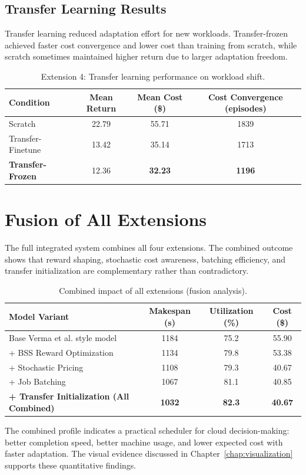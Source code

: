 \subsection{Transfer Learning Results}
Transfer learning reduced adaptation effort for new workloads. Transfer-frozen achieved faster cost convergence and lower cost than training from scratch, while scratch sometimes maintained higher return due to larger adaptation freedom.

\renewcommand{\arraystretch}{1.15}
\begin{table}[H]
\centering
\caption{Extension 4: Transfer learning performance on workload shift.}
\label{tab:ext4_results}
\begin{tabular}{|l|c|c|c|}
\hline
\textbf{Condition} & \textbf{Mean Return} & \textbf{Mean Cost (\$)} & \textbf{Cost Convergence (episodes)} \\
\hline
Scratch & 22.79 & 55.71 & 1839 \\
\hline
Transfer-Finetune & 13.42 & 35.14 & 1713 \\
\hline
\textbf{Transfer-Frozen} & 12.36 & \textbf{32.23} & \textbf{1196} \\
\hline
\end{tabular}
\end{table}

\section{Fusion of All Extensions}
The full integrated system combines all four extensions. The combined outcome shows that reward shaping, stochastic cost awareness, batching efficiency, and transfer initialization are complementary rather than contradictory.

\renewcommand{\arraystretch}{1.15}
\begin{table}[H]
\centering
\caption{Combined impact of all extensions (fusion analysis).}
\label{tab:fusion_results}
\begin{tabular}{|l|c|c|c|}
\hline
\textbf{Model Variant} & \textbf{Makespan (s)} & \textbf{Utilization (\%)} & \textbf{Cost (\$)} \\
\hline
Base Verma et al. style model & 1184 & 75.2 & 55.90 \\
\hline
+ BSS Reward Optimization & 1134 & 79.8 & 53.38 \\
\hline
+ Stochastic Pricing & 1108 & 79.3 & 40.67 \\
\hline
+ Job Batching & 1067 & 81.1 & 40.85 \\
\hline
\textbf{+ Transfer Initialization (All Combined)} & \textbf{1032} & \textbf{82.3} & \textbf{40.67} \\
\hline
\end{tabular}
\end{table}

The combined profile indicates a practical scheduler for cloud decision-making: better completion speed, better machine usage, and lower expected cost with faster adaptation. The visual evidence discussed in Chapter~\ref{chap:visualization} supports these quantitative findings.
